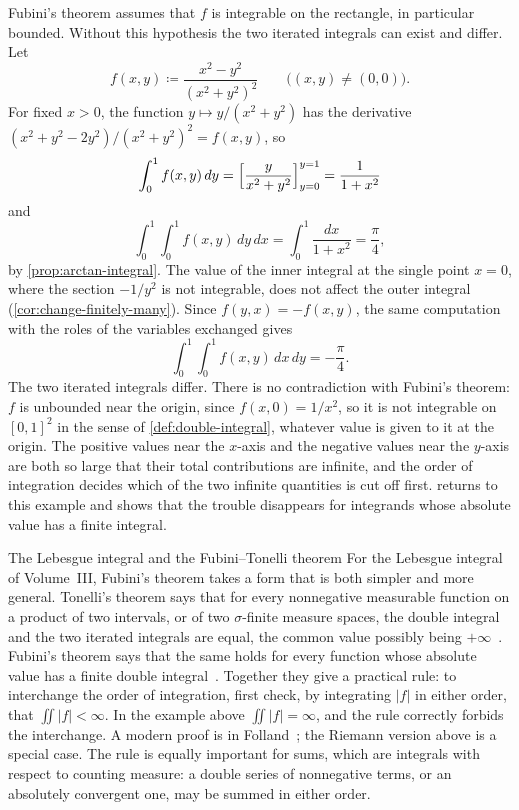 Fubini's theorem assumes that $f$ is integrable on the rectangle, in particular bounded. Without this hypothesis the two iterated integrals can exist and differ. Let
\[
f(x,y)\coloneqq\frac{x^2-y^2}{(x^2+y^2)^2}\qquad\bigl((x,y)\ne(0,0)\bigr).
\]
For fixed $x>0$, the function $y\mapsto y/(x^2+y^2)$ has the derivative $(x^2+y^2-2y^2)/(x^2+y^2)^2=f(x,y)$, so
\[
\int_0^1f(x,y)\,dy=\Bigl[\frac y{x^2+y^2}\Bigr]_{y=0}^{y=1}=\frac1{1+x^2}
\]
and
\[
\int_0^1\int_0^1f(x,y)\,dy\,dx=\int_0^1\frac{dx}{1+x^2}=\frac\pi4 ,
\]
by \cref{prop:arctan-integral}. The value of the inner integral at the single point $x=0$, where the section $-1/y^2$ is not integrable, does not affect the outer integral (\cref{cor:change-finitely-many}). Since $f(y,x)=-f(x,y)$, the same computation with the roles of the variables exchanged gives
\[
\int_0^1\int_0^1f(x,y)\,dx\,dy=-\frac\pi4 .
\]
The two iterated integrals differ. There is no contradiction with Fubini's theorem: $f$ is unbounded near the origin, since $f(x,0)=1/x^2$, so it is not integrable on $[0,1]^2$ in the sense of \cref{def:double-integral}, whatever value is given to it at the origin. The positive values near the $x$-axis and the negative values near the $y$-axis are both so large that their total contributions are infinite, and the order of integration decides which of the two infinite quantities is cut off first.  returns to this example and shows that the trouble disappears for integrands whose absolute value has a finite integral.

\begin{note}{The Lebesgue integral and the Fubini--Tonelli theorem}
For the Lebesgue integral of Volume~III, Fubini's theorem takes a form that is both simpler and more general. Tonelli's theorem says that for every nonnegative measurable function on a product of two intervals, or of two $\sigma$-finite measure spaces, the double integral and the two iterated integrals are equal, the common value possibly being $+\infty$~\cite{tonelli1909}. Fubini's theorem says that the same holds for every function whose absolute value has a finite double integral~\cite{fubini1907}. Together they give a practical rule: to interchange the order of integration, first check, by integrating $|f|$ in either order, that $\iint|f|<\infty$. In the example above $\iint|f|=\infty$, and the rule correctly forbids the interchange. A modern proof is in Folland~\cite[Sect.~2.5]{folland1999}; the Riemann version above is a special case. The rule is equally important for sums, which are integrals with respect to counting measure: a double series of nonnegative terms, or an absolutely convergent one, may be summed in either order.
\end{note}

